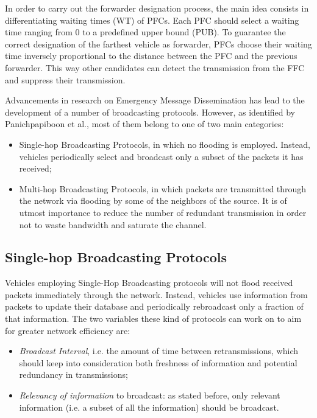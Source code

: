 		
		In order to carry out the forwarder designation process, the main idea consists in differentiating waiting times (WT) of PFCs. Each PFC should select a waiting time ranging from 0 to a predefined upper bound (PUB). To guarantee the correct designation of the farthest vehicle as forwarder, PFCs choose their waiting time inversely proportional to the distance between the PFC and the previous forwarder. This way other candidates can detect the transmission from the FFC and suppress their transmission.
		
		Advancements in research on Emergency Message Dissemination has lead to the development of a number of broadcasting protocols. However, as identified by Panichpapiboon et al.\cite{5989903}, most of them belong to one of two main categories:
		\begin{itemize}
			\item Single-hop Broadcasting Protocols, in which no flooding is employed. Instead, vehicles periodically select and broadcast only a subset of the packets it has received;
			\item Multi-hop Broadcasting Protocols, in which packets are transmitted through the network via flooding by some of the neighbors of the source. It is of utmost importance to reduce the number of redundant transmission in order not to waste bandwidth and saturate the channel.
		\end{itemize}
		
		\subsection{Single-hop Broadcasting Protocols}
			Vehicles employing Single-Hop Broadcasting protocols will not flood received packets immediately through the network. Instead, vehicles use information from packets to update their database and periodically rebroadcast only a fraction of that information. The two variables these kind of protocols can work on to aim for greater network efficiency are:
			\begin{itemize}
				\item \textit{Broadcast Interval}, i.e. the amount of time between retransmissions, which should keep into consideration both freshness of information and potential redundancy in transmissions;
				\item \textit{Relevancy of information} to broadcast: as stated before, only relevant information (i.e. a subset of all the information) should be broadcast.
			\end{itemize}
			
